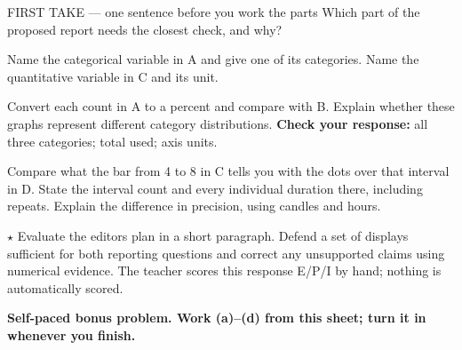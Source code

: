 \documentclass[12pt]{extarticle}
\begin{document}
\begin{firsttakebox}{FIRST TAKE --- one sentence before you work the parts}
Which part of the proposed report needs the closest check, and why?
\end{firsttakebox}

\begin{description}[leftmargin=1.15in, labelwidth=1in, itemsep=2pt, topsep=2pt]
  \item[\dokbadge{1}~(a)] Name the categorical variable in A and give one of its categories. Name the quantitative variable in C and its unit.
  \item[\dokbadge{2}~(b)] Convert each count in A to a percent and compare with B. Explain whether these graphs represent different category distributions. \textbf{Check your response:} \fbox{\rule{0pt}{0.65em}\hspace{0.65em}} all three categories; \fbox{\rule{0pt}{0.65em}\hspace{0.65em}} total used; \fbox{\rule{0pt}{0.65em}\hspace{0.65em}} axis units.
  \item[\dokbadge{2}~(c)] Compare what the bar from 4 to 8 in C tells you with the dots over that interval in D. State the interval count and every individual duration there, including repeats. Explain the difference in precision, using candles and hours.
  \item[\dokbadge{3}~(d)] $\star$ Evaluate the editor\textquotesingle s plan in a short paragraph. Defend a set of displays sufficient for both reporting questions and correct any unsupported claims using numerical evidence. The teacher scores this response E/P/I by hand; nothing is automatically scored.
\end{description}

\vfill
\textbf{Self-paced bonus problem. Work (a)--(d) from this sheet; turn it in whenever you finish.}
\end{document}
